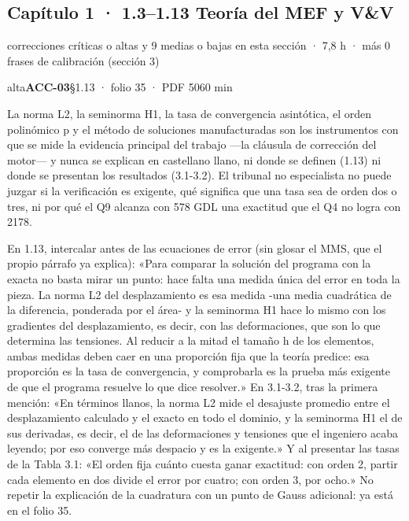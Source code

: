 \subsection{Capítulo 1 · 1.3–1.13 Teoría del MEF y V\&V}
{\small\color{gris} correcciones críticas o altas y 9 medias o bajas en esta sección · 7,8 h · más 0 frases de calibración (sección 3)}\par
\begin{ficha}{alta}{\casilla\textbf{ACC-03}\quad{}\quad §1.13 · folio 35 · PDF 50\hfill 60 min}
\par
{}La norma L2, la seminorma H1, la tasa de convergencia asintótica, el orden polinómico p y el método de soluciones manufacturadas son los instrumentos con que se mide la evidencia principal del trabajo —la cláusula de corrección del motor— y nunca se explican en castellano llano, ni donde se definen (1.13) ni donde se presentan los resultados (3.1-3.2). El tribunal no especialista no puede juzgar si la verificación es exigente, qué significa que una tasa sea de orden dos o tres, ni por qué el Q9 alcanza con 578 GDL una exactitud que el Q4 no logra con 2178.\par
{}En 1.13, intercalar antes de las ecuaciones de error (sin glosar el MMS, que el propio párrafo ya explica): «Para comparar la solución del programa con la exacta no basta mirar un punto: hace falta una medida única del error en toda la pieza. La norma L2 del desplazamiento es esa medida -una media cuadrática de la diferencia, ponderada por el área- y la seminorma H1 hace lo mismo con los gradientes del desplazamiento, es decir, con las deformaciones, que son lo que determina las tensiones. Al reducir a la mitad el tamaño h de los elementos, ambas medidas deben caer en una proporción fija que la teoría predice: esa proporción es la tasa de convergencia, y comprobarla es la prueba más exigente de que el programa resuelve lo que dice resolver.» En 3.1-3.2, tras la primera mención: «En términos llanos, la norma L2 mide el desajuste promedio entre el desplazamiento calculado y el exacto en todo el dominio, y la seminorma H1 el de sus derivadas, es decir, el de las deformaciones y tensiones que el ingeniero acaba leyendo; por eso converge más despacio y es la exigente.» Y al presentar las tasas de la Tabla 3.1: «El orden fija cuánto cuesta ganar exactitud: con orden 2, partir cada elemento en dos divide el error por cuatro; con orden 3, por ocho.» No repetir la explicación de la cuadratura con un punto de Gauss adicional: ya está en el folio 35.\par

\end{ficha}
